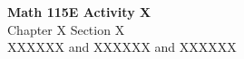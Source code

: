 \documentclass{article}
\begin{document}
\begin{center}
    \Large \textbf{Math 115E Activity X} \\
    \vspace{0.2cm}
    \normalsize Chapter X Section X \\
    \normalsize XXXXXX and XXXXXX and XXXXXX
\end{center}
\vspace{1cm} %
\end{document}
